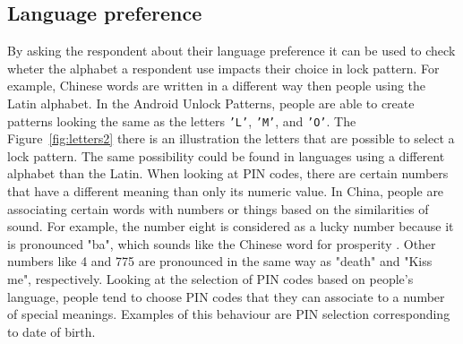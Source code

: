       \subsection*{Language preference}
      By asking the respondent about their language preference it can be used to check wheter the alphabet a respondent use impacts their choice in lock pattern. For example, Chinese words are written in a different way then people using the Latin alphabet. In the Android Unlock Patterns, people are able to create patterns looking the same as the letters \texttt{'L'}, \texttt{'M'}, and \texttt{'O'}. The Figure~\ref{fig:letters2} there is an illustration the letters that are possible to select a lock pattern. The same possibility could be found in languages using a different alphabet than the Latin. When looking at PIN codes, there are certain numbers that have a different meaning than only its numeric value. In China, people are associating certain words with numbers or things based on the similarities of sound. For example, the number eight is considered as a lucky number because it is pronounced "ba", which sounds like the Chinese word for prosperity \cite{ChineseChatCodes}. Other numbers like 4 and 775 are pronounced in the same way as "death" and "Kiss me", respectively. Looking at the selection of PIN codes based on people's language, people tend to choose PIN codes that they can associate to a number of special meanings. Examples of this behaviour are PIN selection corresponding to date of birth. 

